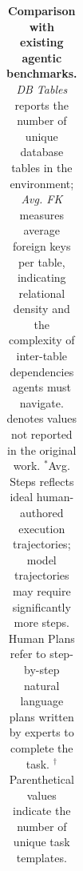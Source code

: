 \begin{table}[h]
{\begin{tabular}{lcccccccccc}
\bottomrule
\end{tabular}%
}
\caption{\textbf{Comparison with existing agentic benchmarks.} \textit{DB Tables} reports the number of unique database tables in the environment; \textit{Avg. FK} measures average foreign keys per table, indicating relational density and the complexity of inter-table dependencies agents must navigate. \textemdash{} denotes values not reported in the original work. $^*$Avg. Steps reflects ideal human-authored execution trajectories; model trajectories may require significantly more steps. Human Plans refer to step-by-step natural language plans written by experts to complete the task. $^{\dagger}$Parenthetical values indicate the number of unique task templates.}
\label{tab:related_works_comparison}
\end{table}